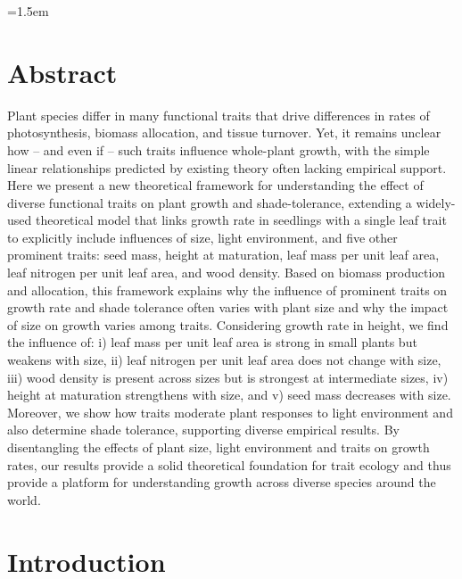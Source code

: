 \documentclass[a4paper,11pt]{article}
\date{}
\begin{document}
\mstitlepage
\noindent
\parindent=1.5em
\addtolength{\parskip}{.3em}


\section{Abstract}

Plant species differ in many functional traits that drive differences in rates of photosynthesis, biomass allocation, and tissue turnover. Yet, it remains unclear how -- and even if -- such traits influence whole-plant growth, with the simple linear relationships predicted by existing theory often lacking empirical support. Here we present a new theoretical framework for understanding the effect of diverse functional traits on plant growth and shade-tolerance, extending a widely-used theoretical model that links growth rate in seedlings with a single leaf trait to explicitly include influences of size, light environment, and five other prominent traits: seed mass, height at maturation, leaf mass per unit leaf area, leaf nitrogen per unit leaf area, and wood density. Based on biomass production and allocation, this framework explains why the influence of prominent traits on growth rate and shade tolerance often varies with plant size and why the impact of size on growth varies among traits. Considering  growth rate in height, we find the influence of: i) leaf mass per unit leaf area is strong in small plants but weakens with size, ii) leaf nitrogen per unit leaf area does not change with size, iii) wood density is present across sizes but is strongest at intermediate sizes, iv) height at maturation strengthens with size, and v) seed mass decreases with size. Moreover, we show how traits moderate plant responses to light environment and also determine shade tolerance, supporting diverse empirical results. By disentangling the effects of plant size, light environment and traits on growth rates, our results provide a solid theoretical foundation for trait ecology and thus provide a platform for understanding growth across diverse species around the world.

\section{Introduction}
\end{document}
